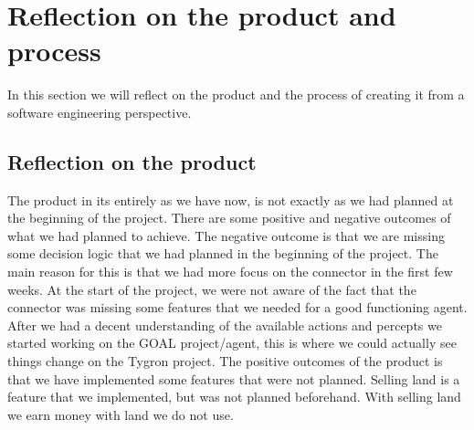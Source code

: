 \chapter{Reflection on the product and process}
In this section we will reflect on the product and the process of creating it from a software engineering perspective.

\section{Reflection on the product}
The product in its entirely as we have now, is not exactly as we had planned at the beginning of the project. There are some positive and negative outcomes of what we had planned to achieve. The negative outcome is that we are missing some decision logic that we had planned in the beginning of the project. The main reason for this is that we had more focus on the connector in the first few weeks. At the start of the project, we were not aware of the fact that the connector was missing some features that we needed for a good functioning agent. After we had a decent understanding of the available actions and percepts we started working on the GOAL project/agent, this is where we could actually see things change on the Tygron project.
The positive outcomes of the product is that we have implemented some features that were not planned. Selling land is a feature that we implemented, but was not planned beforehand. With selling land we earn money with land we do not use. 

